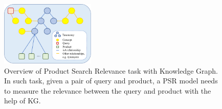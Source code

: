 


\begin{figure}[th] \centering
    \includegraphics[width=0.4\textwidth]{task_overview3}
    \caption{Overview of Product Search Relevance task with Knowledge Graph. In such task, given a pair of query and product, a PSR model needs to measure the relevance between the query and product with the help of KG.}
    \label{fig:taskoverview}
\end{figure}





